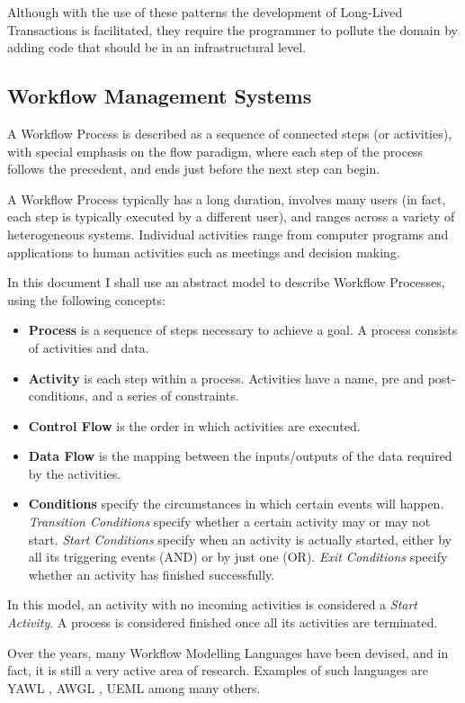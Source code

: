 \documentclass{llncs}
\begin{document}
Although with the use of these patterns the development of Long-Lived
Transactions is facilitated, they require the programmer to pollute
the domain by adding code that should be in an infrastructural level.

\subsection{Workflow Management Systems}

A Workflow Process is described as a sequence of connected steps (or
activities), with special emphasis on the flow paradigm, where each
step of the process follows the precedent, and ends just before the
next step can begin.

A Workflow Process typically has a long duration, involves many users
(in fact, each step is typically executed by a different user), and
ranges across a variety of heterogeneous systems. Individual
activities range from computer programs and applications to human
activities such as meetings and decision making.

In this document I shall use an abstract model to describe Workflow
Processes, using the following concepts:
\begin{itemize}
\item {\bf Process} is a sequence of steps necessary to achieve a
  goal. A process consists of activities and data.
\item {\bf Activity} is each step within a process. Activities have a
  name, pre and post-conditions, and a series of constraints.
\item {\bf Control Flow} is the order in which activities are
  executed.
\item {\bf Data Flow} is the mapping between the inputs/outputs of the
  data required by the activities.
\item {\bf Conditions} specify the circumstances in which certain
  events will happen. {\it Transition Conditions} specify whether a
  certain activity may or may not start. {\it Start Conditions}
  specify when an activity is actually started, either by all its
  triggering events (AND) or by just one (OR). {\it Exit Conditions}
  specify whether an activity has finished successfully.
\end{itemize}
In this model, an activity with no incoming activities is considered a
{\it Start Activity}. A process is considered finished once all its
activities are terminated.

Over the years, many Workflow Modelling Languages have been devised,
and in fact, it is still a very active area of research. Examples of
such languages are YAWL \cite{van2005yawl}, AWGL
\cite{fahringer2005specification}, UEML \cite{vernadat2002ueml} among
many others.
\end{document}
